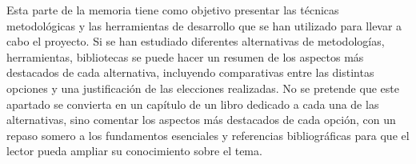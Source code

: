 
Esta parte de la memoria tiene como objetivo presentar las técnicas metodológicas y las herramientas de desarrollo que se han utilizado para llevar a cabo el proyecto. Si se han estudiado diferentes alternativas de metodologías, herramientas, bibliotecas se puede hacer un resumen de los aspectos más destacados de cada alternativa, incluyendo comparativas entre las distintas opciones y una justificación de las elecciones realizadas. 
No se pretende que este apartado se convierta en un capítulo de un libro dedicado a cada una de las alternativas, sino comentar los aspectos más destacados de cada opción, con un repaso somero a los fundamentos esenciales y referencias bibliográficas para que el lector pueda ampliar su conocimiento sobre el tema.



